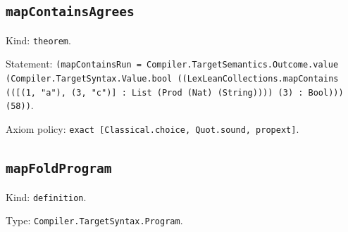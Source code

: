 \documentclass[11pt]{article}
\begin{document}
\subsection*{\texttt{mapContainsAgrees}}
\noindent Kind: \texttt{theorem}.\par
\noindent Statement: \texttt{(mapContainsRun = Compiler.TargetSemantics.Outcome.value (Compiler.TargetSyntax.Value.bool ((LexLeanCollections.mapContains (([(1, "a"), (3, "c")] : List (Prod (Nat) (String)))) (3) : Bool))) (58))}.\par
\noindent Axiom policy: \texttt{exact [Classical.choice, Quot.sound, propext]}.\par
\subsection*{\texttt{mapFoldProgram}}
\noindent Kind: \texttt{definition}.\par
\noindent Type: \texttt{Compiler.TargetSyntax.Program}.\par
\end{document}
